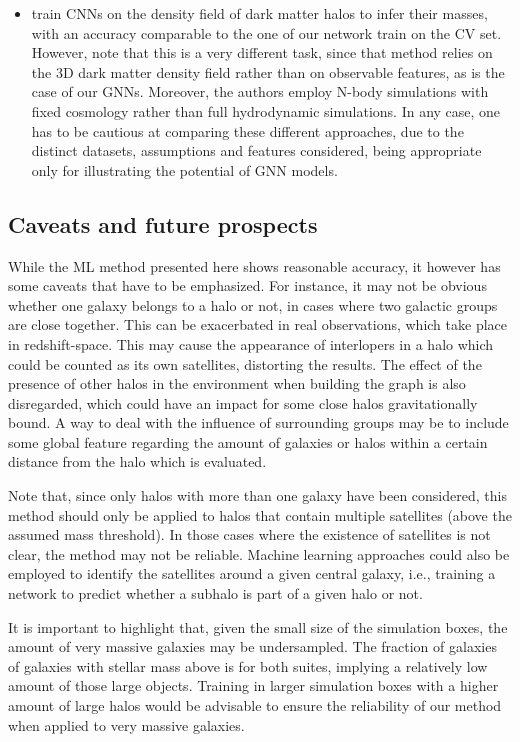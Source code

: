 \documentclass[twocolumn]{aastex631}
\begin{document}
\begin{itemize}
\item \cite{2020arXiv201110577L} train CNNs on the density field of dark matter halos to infer their masses, with an accuracy comparable to the one of our network train on the CV set. However, note that this is a very different task, since that method relies on the 3D dark matter density field rather than on observable features, as is the case of our GNNs. Moreover, the authors employ N-body simulations with fixed cosmology rather than full hydrodynamic simulations. In any case, one has to be cautious at comparing these different approaches, due to the distinct datasets, assumptions and features considered, being appropriate only for illustrating the potential of GNN models.

\end{itemize}

\subsection{Caveats and future prospects}


While the ML method presented here shows reasonable accuracy, it however has some caveats that have to be emphasized. For instance, it may not be obvious whether one galaxy belongs to a halo or not, in cases where two galactic groups are close together. This can be exacerbated in real observations, which take place in redshift-space. This may cause the appearance of interlopers in a halo which could be counted as its own satellites, distorting the results. The effect of the presence of other halos in the environment when building the graph is also disregarded, which could have an impact for some close halos gravitationally bound. A way to deal with the influence of surrounding groups may be to include some global feature regarding the amount of galaxies or halos within a certain distance from the halo which is evaluated.

Note that, since only halos with more than one galaxy have been considered, this method should only be applied to halos that contain multiple satellites (above the assumed mass threshold). In those cases where the existence of satellites is not clear, the method may not be reliable. Machine learning approaches could also be employed to identify the satellites around a given central galaxy, i.e., training a network to predict whether a subhalo is part of a given halo or not.

It is important to highlight that, given the small size of the simulation boxes, the amount of very massive galaxies may be undersampled. The fraction of galaxies of galaxies with stellar mass above  is  for both suites, implying a relatively low amount of those large objects. Training in larger simulation boxes with a higher amount of large halos would be advisable to ensure the reliability of our method when applied to very massive galaxies.
\end{document}
